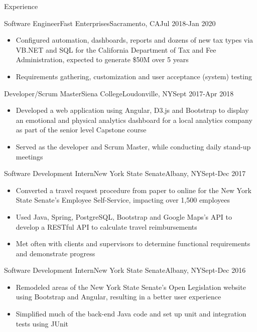 \documentclass[]{xjavathehutt}
\begin{document}
\makeheader


\begin{cvsection}{Experience}
  \begin{cvsubsection}{Software Engineer}{Fast Enterprises}{Sacramento, CA}{Jul 2018-Jan 2020}
    \begin{itemize}
      \item{Configured automation, dashboards, reports and dozens of new tax types via VB.NET and SQL for the California Department of Tax and Fee Administration, expected
      to generate \$50M over 5 years}
      \item{Requirements gathering, customization and user acceptance (system) testing}
    \end{itemize}
  \end{cvsubsection}

  \begin{cvsubsection}{Developer/Scrum Master}{Siena College}{Loudonville, NY}{Sept 2017-Apr 2018}
    \begin{itemize}
      \item{Developed a web application using Angular, D3.js and Bootstrap to display an emotional and physical
          analytics dashboard for a local analytics company as part of the senior level Capstone course}
      \item{Served as the developer and Scrum Master, while conducting daily stand-up meetings}
    \end{itemize}
  \end{cvsubsection}

  \begin{cvsubsection}{Software Development Intern}{New York State Senate}{Albany, NY}{Sept-Dec 2017}
    \begin{itemize}
      \item{Converted a travel request procedure from paper to online for the New York
        State Senate's Employee Self-Service, impacting over 1,500 employees}
      \item{Used Java, Spring, PostgreSQL, Bootstrap and Google Maps's API to develop a RESTful API to calculate travel reimbursements}
      \item{Met often with clients and supervisors to determine functional requirements and demonstrate progress}
    \end{itemize}
  \end{cvsubsection}

  \begin{cvsubsection}{Software Development Intern}{New York State Senate}{Albany, NY}{Sept-Dec 2016}
    \begin{itemize}
      \item{Remodeled areas of the New York State Senate's Open Legislation website using Bootstrap
        and Angular, resulting in a better user experience}
      \item{Simplified much of the back-end Java code and set up unit and integration tests using
        JUnit}
    \end{itemize}
  \end{cvsubsection}
\end{cvsection}
\end{document}
